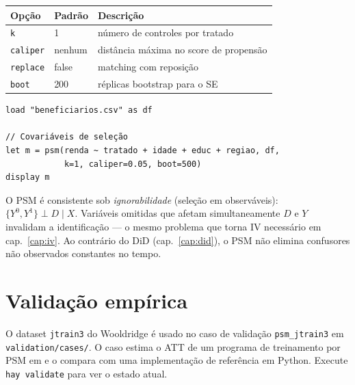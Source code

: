 \begin{center}
\begin{tabular}{lll}
\toprule
\textbf{Opção} & \textbf{Padrão} & \textbf{Descrição} \\
\midrule
\texttt{k}        & 1       & número de controles por tratado \\
\texttt{caliper}  & nenhum  & distância máxima no score de propensão \\
\texttt{replace}  & false   & matching com reposição \\
\texttt{boot}     & 200     & réplicas bootstrap para o SE \\
\bottomrule
\end{tabular}
\end{center}

\begin{lstlisting}[caption={Fluxo típico — avaliação de programa}]
load "beneficiarios.csv" as df

// Covariáveis de seleção
let m = psm(renda ~ tratado + idade + educ + regiao, df,
            k=1, caliper=0.05, boot=500)
display m
\end{lstlisting}

\begin{nota}
  O PSM é consistente sob \emph{ignorabilidade} (seleção em observáveis):
  $\{Y^0, Y^1\} \perp D \mid X$. Variáveis omitidas que afetam
  simultaneamente $D$ e $Y$ invalidam a identificação — o mesmo problema
  que torna IV necessário em cap.~\ref{cap:iv}. Ao contrário do DiD
  (cap.~\ref{cap:did}), o PSM não elimina confusores não observados
  constantes no tempo.
\end{nota}

\section{Validação empírica}

O dataset \texttt{jtrain3} do Wooldridge é usado no caso de validação
\texttt{psm\_jtrain3} em \texttt{validation/cases/}. O caso estima o ATT de
um programa de treinamento por PSM em \hayashi{} e o compara com uma
implementação de referência em Python. Execute \lstinline{hay validate} para
ver o estado atual.

